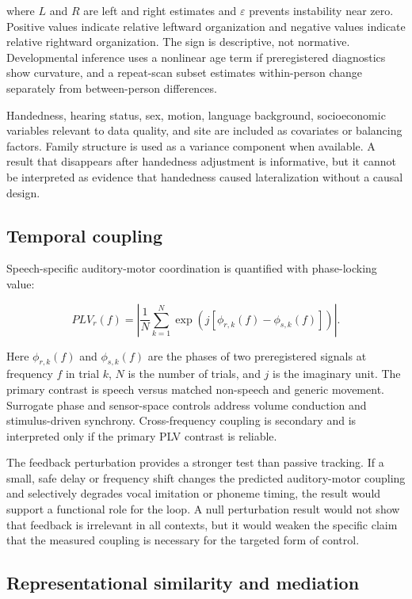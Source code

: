 \documentclass[conference]{IEEEtran}
\begin{document}
where $L$ and $R$ are left and right estimates and $\varepsilon$ prevents instability near zero. Positive values indicate relative leftward organization and negative values indicate relative rightward organization. The sign is descriptive, not normative. Developmental inference uses a nonlinear age term if preregistered diagnostics show curvature, and a repeat-scan subset estimates within-person change separately from between-person differences.

Handedness, hearing status, sex, motion, language background, socioeconomic variables relevant to data quality, and site are included as covariates or balancing factors. Family structure is used as a variance component when available. A result that disappears after handedness adjustment is informative, but it cannot be interpreted as evidence that handedness caused lateralization without a causal design.

\subsection{Temporal coupling}

Speech-specific auditory-motor coordination is quantified with phase-locking value:

\begin{equation}
PLV_r(f)=\left|\frac{1}{N}\sum_{k=1}^{N}\exp\left(j[\phi_{r,k}(f)-\phi_{s,k}(f)]\right)\right|.
\label{eq:plv}
\end{equation}

Here $\phi_{r,k}(f)$ and $\phi_{s,k}(f)$ are the phases of two preregistered signals at frequency $f$ in trial $k$, $N$ is the number of trials, and $j$ is the imaginary unit. The primary contrast is speech versus matched non-speech and generic movement. Surrogate phase and sensor-space controls address volume conduction and stimulus-driven synchrony. Cross-frequency coupling is secondary and is interpreted only if the primary PLV contrast is reliable.

The feedback perturbation provides a stronger test than passive tracking. If a small, safe delay or frequency shift changes the predicted auditory-motor coupling and selectively degrades vocal imitation or phoneme timing, the result would support a functional role for the loop. A null perturbation result would not show that feedback is irrelevant in all contexts, but it would weaken the specific claim that the measured coupling is necessary for the targeted form of control.

\subsection{Representational similarity and mediation}
\end{document}

